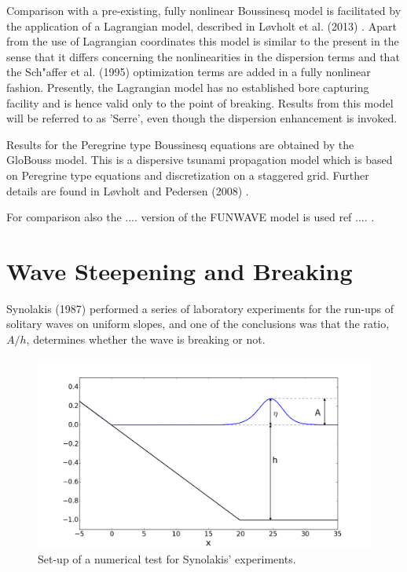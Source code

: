 \documentclass[review]{elsarticle}
\begin{document}
Comparison with a pre-existing, fully nonlinear Boussinesq model is
facilitated by the application of a Lagrangian model, described
in L\o vholt et al. (2013) \cite{Lovholt:2013b}. Apart from the use of
Lagrangian coordinates this model is similar to the present
in the sense that it differs concerning the nonlinearities in the
dispersion terms and that  the Sch{"a}ffer et al. (1995) \cite{schaffer1995further} optimization terms are added in a fully nonlinear fashion.
Presently, the Lagrangian model has no established bore capturing 
facility and is hence valid only to the point of breaking.
Results from this model will be referred to as 'Serre', even though
the dispersion enhancement is invoked. 
 
Results for the Peregrine type Boussinesq equations are obtained by the
GloBouss model. This is a dispersive tsunami propagation model which
is based on Peregrine type equations and discretization on a staggered grid. Further details are found in L\o vholt and Pedersen (2008)
\cite{Lovholt:2008b}.

For comparison also the .... version of the FUNWAVE model is used
ref .... . 

\section{Wave Steepening and Breaking}



Synolakis (1987) \cite{synolakis1987runup} performed 
a series of laboratory experiments for the run-ups of solitary waves
on uniform slopes,
and one of the conclusions was that
the ratio, $A/h$, determines
whether the wave is breaking or not. 

\begin{figure}[!htb]
\centering
\includegraphics[width=.7\textwidth]{_fig/initial_setup.png}
\caption{Set-up of a numerical test for Synolakis' experiments.}
\label{fig:init_setup}
\end{figure}
\end{document}
